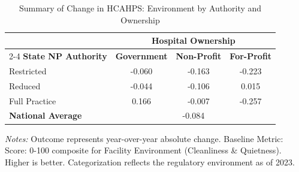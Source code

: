 \begin{table}[htbp]
    \centering
    \caption{Summary of Change in HCAHPS: Environment by Authority and Ownership}
    \label{tab:d_hcahps_grp3_own}
    \vspace{0.2cm}
    \begin{tabular}{lccc}
        \toprule
        & \multicolumn{3}{c}{\textbf{Hospital Ownership}} \\
        \cmidrule(lr){2-4}
        \textbf{State NP Authority} & \textbf{Government} & \textbf{Non-Profit} & \textbf{For-Profit} \\
        \midrule
        Restricted & -0.060 & -0.163 & -0.223 \\
        Reduced & -0.044 & -0.106 & 0.015 \\
        Full Practice & 0.166 & -0.007 & -0.257 \\
        \midrule
        \textbf{National Average} & \multicolumn{3}{c}{-0.084} \\
        \bottomrule
    \end{tabular}
    \vspace{0.1cm}
    \begin{minipage}{0.85\textwidth}
        \footnotesize \textit{Notes:} Outcome represents year-over-year absolute change. Baseline Metric: Score: 0-100 composite for Facility Environment (Cleanliness \& Quietness). Higher is better. Categorization reflects the regulatory environment as of 2023.
    \end{minipage}
\end{table}